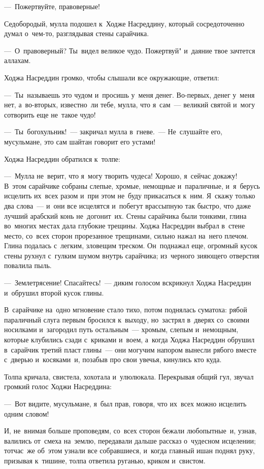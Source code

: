\documentclass[12pt,a4paper]{book}
\begin{document}
—~Пожертвуйте, правоверные!

Седобородый, мулла подошел к~Ходже Насреддину, который сосредоточенно думал о~чем-то, разглядывая стены сарайчика.

—~О~правоверный? Ты~видел великое чудо. Пожертвуй" и~даяние твое зачтется аллахам.

Ходжа Насреддин громко, чтобы слышали все окружающие, ответил:

—~Ты~называешь это чудом и~просишь у~меня денег. Во-первых, денег у~меня нет, а~во-вторых, известно~ли тебе, мулла, что я~сам~— великий святой и~могу сотворить еще не~такое чудо!

—~Ты~богохульник!~— закричал мулла в~гневе.~— Не~слушайте его, мусульмане, это сам шайтан говорит его устами!

Ходжа Насреддин обратился к~толпе:

—~Мулла не~верит, что я~могу творить чудеса! Хорошо, я~сейчас докажу! В~этом сарайчике собраны слепые, хромые, немощные и~параличные, и~я~берусь исцелить их~всех разом и~при этом не~буду прикасаться к~ним. Я~скажу только два слова~— и~они все исцелятся и~побегут врассыпную так быстро, что даже лучший арабский конь не~догонит~их. Стены сарайчика были тонкими, глина во~многих местах дала глубокие трещины. Ходжа Насреддин выбрал в~стене место, со~всех сторон прорезанное трещинами, сильно нажал на~него плечом. Глина подалась с~легким, зловещим треском. Он~поднажал еще, огромный кусок стены рухнул с~гулким шумом внутрь сарайчика; из~черного зияющего отверстия повалила пыль.

—~Землетрясение! Спасайтесь!~— диким голосом вскрикнул Ходжа Насреддин и~обрушил второй кусок глины.

В~сарайчике на~одно мгновение стало тихо, потом поднялась суматоха: рябой параличный слуга первым бросился к~выходу, но~застрял в~дверях со~своими носилками и~загородил путь остальным~— хромым, слепым и~немощным, которые клубились сзади с~криками и~воем, а~когда Ходжа Насреддин обрушил в~сарайчик третий пласт глины~— они могучим напором вынесли рябого вместе с~дверью и~косяками~и, позабыв про свои увечья, кинулись кто куда.

Толпа кричала, свистела, хохотала и~улюлюкала. Перекрывая общий гул, звучал громкий голос Ходжи Насреддина:

—~Вот видите, мусульмане, я~был прав, говоря, что их~всех можно исцелить одним словом!

И, не~внимая больше проповедям, со~всех сторон бежали любопытные~и, узнав, валились от~смеха на~землю, передавали дальше рассказ о~чудесном исцелении; тотчас~же об~этом узнали все собравшиеся, и~когда главный ишан поднял руку, призывая к~тишине, толпа ответила руганью, криком и~свистом.
\end{document}

